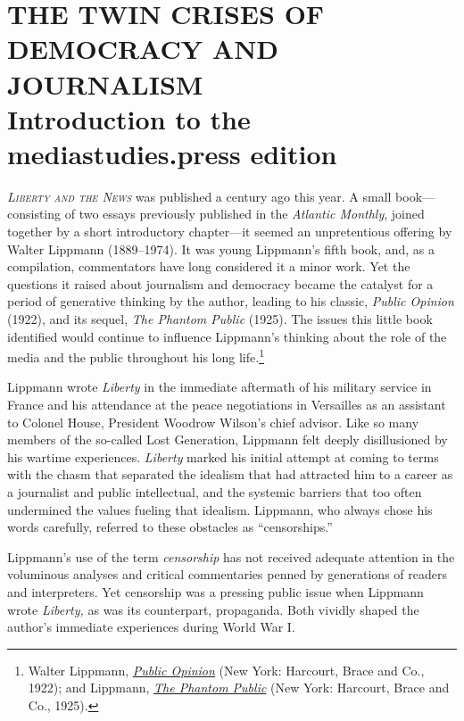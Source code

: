 \documentclass[openany,nobib,nohyper]{tufte-book}
\let\oldchapter\chapter
\def\chapter{%
  \setcounter{footnote}{0}%
  \oldchapter
}
\begin{document}
\chapter[THE TWIN CRISES OF DEMOCRACY AND JOURNALISM]{THE TWIN CRISES OF DEMOCRACY AND\\ JOURNALISM\\ Introduction to the mediastudies.press edition}
\label{ch:introduction-msp}

\emph{}

\vspace{0.5in}

\noindent \textsc{\emph{Liberty and the News}} was published a century ago this year. A
small book---consisting of two essays previously published in the
\emph{Atlantic Monthly}, joined together by a short introductory
chapter---it seemed an unpretentious offering by Walter Lippmann
(1889--1974). It was young Lippmann's fifth book, and, as a compilation,
commentators have long considered it a minor work. Yet the questions it
raised about journalism and democracy became the catalyst for a period
of generative thinking by the author, leading to his classic,
\emph{Public Opinion} (1922), and its sequel, \emph{The Phantom Public}
(1925). The issues this little book identified would continue to
influence Lippmann's thinking about the role of the media and the public
throughout his long life.\footnote{Walter Lippmann,
  \emph{\href{http://www.worldcat.org/oclc/812629160}{Public Opinion}}
  (New York: Harcourt, Brace and Co., 1922); and Lippmann,
  \emph{\href{http://www.worldcat.org/oclc/550725}{The Phantom Public}}
  (New York: Harcourt, Brace and Co., 1925).}

Lippmann wrote \emph{Liberty} in the immediate aftermath of his military
service in France and his attendance at the peace negotiations in
Versailles as an assistant to Colonel House, President Woodrow Wilson's
chief advisor. Like so many members of the so-called Lost Generation,
Lippmann felt deeply disillusioned by his wartime experiences.
\emph{Liberty} marked his initial attempt at coming to terms with the
chasm that separated the idealism that had attracted him to a career as
a journalist and public intellectual, and the systemic barriers that too
often undermined the values fueling that idealism. Lippmann, who always
chose his words carefully, referred to these obstacles as
``censorships.''

Lippmann's use of the term \emph{censorship} has not received adequate
attention in the voluminous analyses and critical commentaries penned by
generations of readers and interpreters. Yet censorship was a pressing
public issue when Lippmann wrote \emph{Liberty,} as was its counterpart,
propaganda. Both vividly shaped the author's immediate experiences
during World War I.
\end{document}
